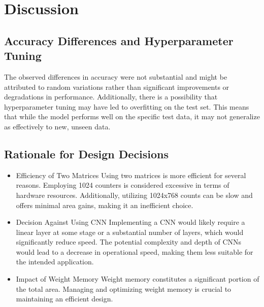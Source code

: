 \documentclass[conference]{IEEEtran}
\newcounter{todocount}
\newcommand{\todo}[1]{
  \stepcounter{todocount}
}
\begin{document}
\section{Discussion}
\label{sec:discussion}
\todo{timing is slower in lower hidden size}

    \subsection{Accuracy Differences and Hyperparameter Tuning}
    The observed differences in accuracy were not substantial and might be attributed to random variations rather than significant improvements or degradations in performance. Additionally, there is a possibility that hyperparameter tuning may have led to overfitting on the test set. This means that while the model performs well on the specific test data, it may not generalize as effectively to new, unseen data.
    \subsection{Rationale for Design Decisions}
    \begin{itemize}
        \item Efficiency of Two Matrices
        Using two matrices is more efficient for several reasons. Employing 1024 counters is considered excessive in terms of hardware resources. Additionally, utilizing 1024x768 counts can be slow and offers minimal area gains, making it an inefficient choice.
        \item Decision Against Using CNN
        Implementing a CNN would likely require a linear layer at some stage or a substantial number of layers, which would significantly reduce speed. The potential complexity and depth of CNNs would lead to a decrease in operational speed, making them less suitable for the intended application.
        \item Impact of Weight Memory
        Weight memory constitutes a significant portion of the total area. Managing and optimizing weight memory is crucial to maintaining an efficient design.
    \end{itemize}
\end{document}
